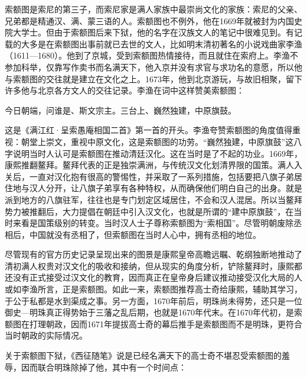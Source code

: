 
索额图是索尼的第三子，而索尼家是满人家族中最崇尚文化的家族：索尼的父亲、兄弟都是精通汉、满、蒙三语的人。索额图也不例外，他在1669年就被封为内国史院大学士。但由于索额图后来下狱，他的名字在汉族文人的笔记中很难见到。有记载的大多是在索额图出事前就已去世的文人，比如明末清初著名的小说戏曲家李渔（1611—1680）。他到了京城，受到索额图热情接待，而且就住在索府上。李渔不参加科举，仅靠写作卖书而名满天下，他入京并没有求官与求功名的意愿，所以他与索额图的交往就是建立在文化之上。1673年，他到北京游玩，与故旧相聚，留下许多他与北京各方文人的交往记录。李渔在词中这样赞美索额图：



\begin{bookquote}今日朝端，问谁是、斯文宗主。三台上、巍然独建，中原旗鼓。\end{bookquote}


这是《满江红·呈索愚庵相国二首》第一首的开头。李渔夸赞索额图的角度值得重视：朝堂上崇文，重视中原文化，这是索额图的功劳。“巍然独建，中原旗鼓”这八字说明当时人认可是索额图在推动清廷汉化。这在当时是了不起的功业。1669年，康熙推翻鳌拜。鳌拜代表的正是独崇满洲，与传统汉文化划清界限的国策。满人入关后，一直对汉化抱有很高的警惕性，并采取了一系列措施，包括要把八旗子弟居住地与汉人分开，让八旗子弟享有各种特权，从而确保他们明白自己的出身。就是派到地方的八旗驻军，往往也是专门划定区域居住，不会和汉人混居。所以当鳌拜势力被推翻后，大力提倡在朝廷中引入汉文化，也就是所谓的“建中原旗鼓”，在当时来看是国策级别的转变。当时汉人士子尊称索额图为“索相国”。尽管明朝废除丞相后，中国就没有丞相了，但索额图在当时人心中，拥有丞相的地位。



尽管现有的官方历史记录呈现出来的图景是康熙皇帝高瞻远瞩、乾纲独断地推动了清初满人权贵对汉文化的吸收和接纳，但从现实的角度分析，铲除鳌拜时，康熙都还没有正式接受过汉文化的教育，因而真正在皇帝身后建议推动接受汉化大局的人或如李渔所言，正是索额图。如此一来，索额图推荐高士奇给康熙，辅助其学习，于公于私都是水到渠成之事。另一方面，1670年前后，明珠尚未得势，还只是一位御史—明珠真正得势始于三藩之乱后期，也就是1670年代末。在1670年代初，是索额图在打理朝政，因而1671年提拔高士奇的幕后推手是索额图而不是明珠，更符合当时朝政的实际情况。



关于索额图下狱，《西征随笔》说是已经名满天下的高士奇不堪忍受索额图的羞辱，因而联合明珠除掉了他，其中有一个时间点：


